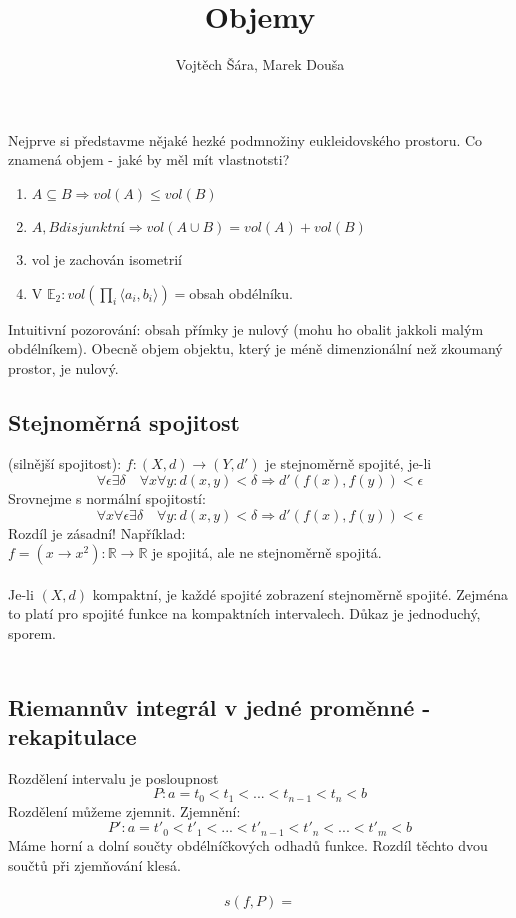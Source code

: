 \documentclass{article}
\title{Objemy}
\author{Vojtěch Šára, Marek Douša}
\begin{document}
\maketitle
Nejprve si představme nějaké hezké podmnožiny eukleidovského prostoru. Co znamená objem - jaké by měl mít vlastnotsti?\\
\begin{enumerate}
    \item$A\subseteq B \Rightarrow vol(A) \leq vol(B)$
    \item$A,B disjunktní \Rightarrow vol(A \cup B) = vol(A) + vol(B)$
    \item vol je zachován isometrií
    \item V $\mathbb{E}_{2}: vol(\prod_{i}\langle a_{i},b_{i}\rangle) = $obsah obdélníku.
\end{enumerate}
Intuitivní pozorování: obsah přímky je nulový (mohu ho obalit jakkoli malým obdélníkem). Obecně objem objektu, který je méně dimenzionální než zkoumaný prostor, je nulový. 

\subsection{Stejnoměrná spojitost}
(silnější spojitost): $f:(X,d) \rightarrow (Y,d')$ je stejnoměrně spojité, je-li
$$\forall \epsilon \exists \delta \quad \forall x \forall y :d(x,y) < \delta \Rightarrow d'(f(x),f(y)) < \epsilon$$
Srovnejme s normální spojitostí:
$$\forall x \forall \epsilon \exists \delta \quad \forall y :d(x,y) < \delta \Rightarrow d'(f(x),f(y)) < \epsilon$$
Rozdíl je zásadní! Například:\\
$f = (x \rightarrow x^{2}): \mathbb{R} \rightarrow  \mathbb{R}$ je spojitá, ale ne stejnoměrně spojitá.\\\\

Je-li $(X,d)$ kompaktní, je každé spojité zobrazení stejnoměrně spojité. Zejména to platí pro spojité funkce na kompaktních intervalech. Důkaz je jednoduchý, sporem.\\\\

\subsection{Riemannův integrál v jedné proměnné - rekapitulace}
Rozdělení intervalu je posloupnost
$$P : a = t_{0} < t_{1} < ... < t_{n-1} < t_{n} < b$$
Rozdělení můžeme zjemnit. Zjemnění:
$$P' : a = t'_{0} < t'_{1} < ... < t'_{n-1} < t'_{n} < ... < t'_{m} < b$$
Máme horní a dolní součty obdélníčkových odhadů funkce. Rozdíl těchto dvou součtů při zjemňování klesá.\\\\
$$s(f,P) = $$ %
\end{document}
